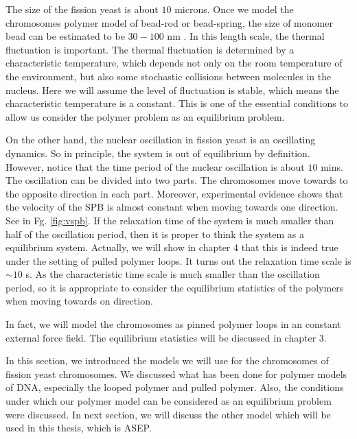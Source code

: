 The size of the fission yeast is about $10$ microns. Once we model the chromosomes polymer model of bead-rod or bead-spring, the size of monomer bead can be estimated to be $30-100$ nm \cite{Vogel2009, Chacon2016}. In this length scale, the thermal fluctuation is important. The thermal fluctuation is determined by a characteristic temperature, which depends not only on the room temperature of the environment, but also some stochastic collisions between molecules in the nucleus. Here we will assume the level of fluctuation is stable, which means the characteristic temperature is a constant. This is one of the essential conditions to allow us consider the polymer problem as an equilibrium problem.

On the other hand, the nuclear oscillation in fission yeast is an oscillating dynamics. So in principle, the system is out of equilibrium by definition. However, notice that the time period of the nuclear oscillation is about $10$ mins. The oscillation can be divided into two parts. The chromosomes move towards to the opposite direction in each part. Moreover, experimental evidence shows that the velocity of the SPB is almost constant when moving towards one direction. See in Fg. \ref{fig:vspb}. 
If the relaxation time of the system is much smaller than half of the oscillation period, then it is proper to think the system as a equilibrium system. Actually, we will show in chapter 4 that this is indeed true under the setting of pulled polymer loops. It turns out the relaxation time scale is $\sim10$ s. As the characteristic time scale is much smaller than the oscillation period, so it is appropriate to consider the equilibrium statistics of the polymers when moving towards on direction. 

In fact, we will model the chromosomes as pinned polymer loops in an constant external force field. The equilibrium statistics will be discussed in chapter 3. 

In this section, we introduced the models we will use for the chromosomes of fission yeast chromosomes. We discussed what has been done for polymer models of DNA, especially the looped polymer and pulled polymer. Also, the conditions under which our polymer model can be considered as an equilibrium problem were discussed. In next section, we will discuss the other model which will be used in this thesis, which is ASEP.

